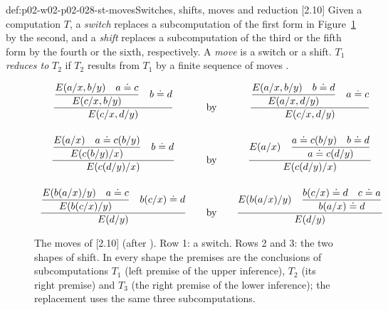 \begin{hbdefinition}{def:p02-w02-p02-028-st-moves}{Switches, shifts, moves and reduction [2.10]}
Given a computation \(T\), a \emph{switch} replaces a subcomputation of the
first form in Figure~\ref{fig:p02-w02-p02-028-st-moves} by the second, and a
\emph{shift} replaces a subcomputation of the third or the fifth form by the
fourth or the sixth, respectively.  A \emph{move} is a switch or a shift.
\(T_1\) \emph{reduces to} \(T_2\) if \(T_2\) results from \(T_1\) by a
finite sequence of moves \cite[\S2.10, pp.~902--903]{Statman1977}.
\end{hbdefinition}

\begin{figure}[htbp]
\centering
\small
\[
\begin{array}{c@{\qquad\text{by}\qquad}c}
\dfrac{\dfrac{E(a/x,b/y)\quad a\doteq c}{E(c/x,b/y)}\quad b\doteq d}{E(c/x,d/y)}
&
\dfrac{\dfrac{E(a/x,b/y)\quad b\doteq d}{E(a/x,d/y)}\quad a\doteq c}{E(c/x,d/y)}
\\[5ex]
\dfrac{\dfrac{E(a/x)\quad a\doteq c(b/y)}{E(c(b/y)/x)}\quad b\doteq d}{E(c(d/y)/x)}
&
\dfrac{E(a/x)\quad\dfrac{a\doteq c(b/y)\quad b\doteq d}{a\doteq c(d/y)}}{E(c(d/y)/x)}
\\[5ex]
\dfrac{\dfrac{E(b(a/x)/y)\quad a\doteq c}{E(b(c/x)/y)}\quad b(c/x)\doteq d}{E(d/y)}
&
\dfrac{E(b(a/x)/y)\quad\dfrac{b(c/x)\doteq d\quad c\doteq a}{b(a/x)\doteq d}}{E(d/y)}
\end{array}
\]
\caption{The moves of [2.10] (after \cite[pp.~902--903]{Statman1977}).  Row 1:
a switch.  Rows 2 and 3: the two shapes of shift.  In every shape the
premises are the conclusions of subcomputations \(T_1\) (left premise of the
upper inference), \(T_2\) (its right premise) and \(T_3\) (the right premise
of the lower inference); the replacement uses the same three subcomputations.}
\label{fig:p02-w02-p02-028-st-moves}
\end{figure}

